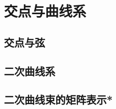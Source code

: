 \section{交点与曲线系}
\label{sec:quadratic-intersections-and-families}


\subsection{交点与弦}
\label{subsec:quadratic-intersections-and-chords}

\subsection{二次曲线系}
\label{subsec:quadratic-conic-families}

\subsection{二次曲线束的矩阵表示*}
\label{subsec:quadratic-conic-pencil-matrices}

